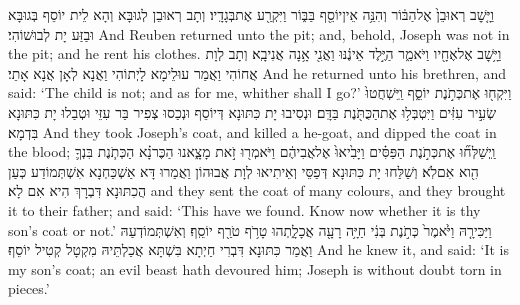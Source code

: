{וַיָּ֤שׇׁב רְאוּבֵן֙ אֶל\maqqaf הַבּ֔וֹר וְהִנֵּ֥ה אֵין\maqqaf יוֹסֵ֖ף בַּבּ֑וֹר וַיִּקְרַ֖ע אֶת\maqqaf בְּגָדָֽיו׃}
{וְתָב רְאוּבֵן לְגוּבָּא וְהָא לֵית יוֹסֵף בְּגוּבָּא וּבַזַּע יָת לְבוּשׁוֹהִי׃}
{And Reuben returned unto the pit; and, behold, Joseph was not in the pit; and he rent his clothes.}{}
{וַיָּ֥שׇׁב אֶל\maqqaf אֶחָ֖יו וַיֹּאמַ֑ר הַיֶּ֣לֶד אֵינֶ֔נּוּ וַאֲנִ֖י אָ֥נָה אֲנִי\maqqaf בָֽא׃}
{וְתָב לְוָת אֲחוֹהִי וַאֲמַר עוּלֵימָא לָיְתוֹהִי וַאֲנָא לְאָן אֲנָא אָתֵי׃}
{And he returned unto his brethren, and said: ‘The child is not; and as for me, whither shall I go?’}{}
{וַיִּקְח֖וּ אֶת\maqqaf כְּתֹ֣נֶת יוֹסֵ֑ף וַֽיִּשְׁחֲטוּ֙ שְׂעִ֣יר עִזִּ֔ים וַיִּטְבְּל֥וּ אֶת\maqqaf הַכֻּתֹּ֖נֶת בַּדָּֽם׃}
{וּנְסִיבוּ יָת כִּתּוּנָא דְּיוֹסֵף וּנְכַסוּ צְפִיר בַּר עִזֵּי וּטְבַלוּ יָת כִּתּוּנָא בִּדְמָא׃}
{And they took Joseph’s coat, and killed a he-goat, and dipped the coat in the blood;}{}
{וַֽיְשַׁלְּח֞וּ אֶת\maqqaf כְּתֹ֣נֶת הַפַּסִּ֗ים וַיָּבִ֙יאוּ֙ אֶל\maqqaf אֲבִיהֶ֔ם וַיֹּאמְר֖וּ זֹ֣את מָצָ֑אנוּ הַכֶּר\maqqaf נָ֗א הַכְּתֹ֧נֶת בִּנְךָ֛ הִ֖וא אִם\maqqaf לֹֽא׃}
{וְשַׁלַּחוּ יָת כִּתּוּנָא דְּפַסֵּי וְאֵיתִיאוּ לְוָת אֲבוּהוֹן וַאֲמַרוּ דָּא אַשְׁכַּחְנָא אִשְׁתְּמוֹדַע כְּעַן הֲכִתּוּנָא דִּבְרָךְ הִיא אִם לָא׃}
{and they sent the coat of many colours, and they brought it to their father; and said: ‘This have we found. Know now whether it is thy son’s coat or not.’}{}
{וַיַּכִּירָ֤הּ וַיֹּ֙אמֶר֙ כְּתֹ֣נֶת בְּנִ֔י חַיָּ֥ה רָעָ֖ה אֲכָלָ֑תְהוּ טָרֹ֥ף טֹרַ֖ף יוֹסֵֽף׃}
{וְאִשְׁתְּמוֹדְעַהּ וַאֲמַר כִּתּוּנָא דִּבְרִי חַיְתָא בִּשְׁתָּא אֲכַלְתֵּיהּ מִקְטָל קְטִיל יוֹסֵף׃}
{And he knew it, and said: ‘It is my son’s coat; an evil beast hath devoured him; Joseph is without doubt torn in pieces.’}{}
